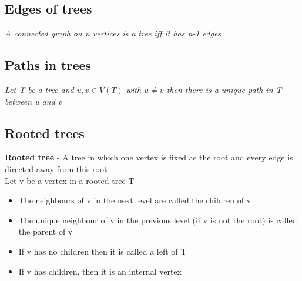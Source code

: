 \documentclass{article}[18pt]
\begin{document}
\subsection{Edges of trees}
\begin{center}
	\textit{A connected graph on n vertices is a tree iff it has n-1 edges}
\end{center}
\subsection{Paths in trees}
\begin{center}
	\textit{Let T be a tree and $u,v\in V(T)$ with $u\neq v$ then there is a unique path in T between u and v}
\end{center}
\subsection{Rooted trees}
\textbf{Rooted tree} - A tree in which one vertex is fixed as the root and every edge is directed away from this root\\
Let v be a vertex in a rooted tree T
\begin{itemize}
	\item The neighbours of v in the next level are called the children of v
	\item The unique neighbour of v in the previous level (if v is not the root) is called the parent of v
	\item If v has no children then it is called a left of T
	\item If v has children, then it is an internal vertex
\end{itemize}
\end{document}
